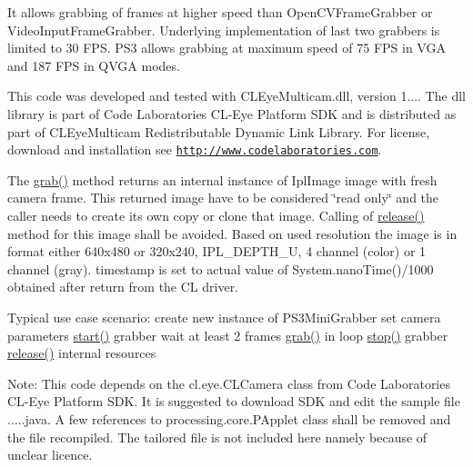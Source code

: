 It allows grabbing of frames at higher speed than Open\+C\+V\+Frame\+Grabber or Video\+Input\+Frame\+Grabber. Underlying implementation of last two grabbers is limited to 30 F\+P\+S. P\+S3 allows grabbing at maximum speed of 75 F\+P\+S in V\+G\+A and 187 F\+P\+S in Q\+V\+G\+A modes.

This code was developed and tested with C\+L\+Eye\+Multicam.\+dll, version 1.... The dll library is part of Code Laboratories C\+L-\/\+Eye Platform S\+D\+K and is distributed as part of C\+L\+Eye\+Multicam Redistributable Dynamic Link Library. For license, download and installation see \href{http://www.codelaboratories.com}{\tt http\+://www.\+codelaboratories.\+com}.

The \hyperlink{classairhockeyjava_1_1detection_1_1_p_s3_eye_frame_grabber_a0b0bf0ce6847d670d7893a4489515982}{grab()} method returns an internal instance of Ipl\+Image image with fresh camera frame. This returned image have to be considered \char`\"{}read only\char`\"{} and the caller needs to create it\textquotesingle{}s own copy or clone that image. Calling of \hyperlink{classairhockeyjava_1_1detection_1_1_p_s3_eye_frame_grabber_a09d5a3ea7d8ceadac6bb8d4167e215e5}{release()} method for this image shall be avoided. Based on used resolution the image is in format either 640x480 or 320x240, I\+P\+L\+\_\+\+D\+E\+P\+T\+H\+\_\+U, 4 channel (color) or 1 channel (gray). timestamp is set to actual value of System.\+nano\+Time()/1000 obtained after return from the C\+L driver.

Typical use case scenario\+: create new instance of P\+S3\+Mini\+Grabber set camera parameters \hyperlink{classairhockeyjava_1_1detection_1_1_p_s3_eye_frame_grabber_aece96fd9b477b95fd74c687313143783}{start()} grabber wait at least 2 frames \hyperlink{classairhockeyjava_1_1detection_1_1_p_s3_eye_frame_grabber_a0b0bf0ce6847d670d7893a4489515982}{grab()} in loop \hyperlink{classairhockeyjava_1_1detection_1_1_p_s3_eye_frame_grabber_a3e225d875694dd7c981591899c04b276}{stop()} grabber \hyperlink{classairhockeyjava_1_1detection_1_1_p_s3_eye_frame_grabber_a09d5a3ea7d8ceadac6bb8d4167e215e5}{release()} internal resources

Note\+: This code depends on the cl.\+eye.\+C\+L\+Camera class from Code Laboratories C\+L-\/\+Eye Platform S\+D\+K. It is suggested to download S\+D\+K and edit the sample file .....java. A few references to processing.\+core.\+P\+Applet class shall be removed and the file recompiled. The tailored file is not included here namely because of unclear licence.

